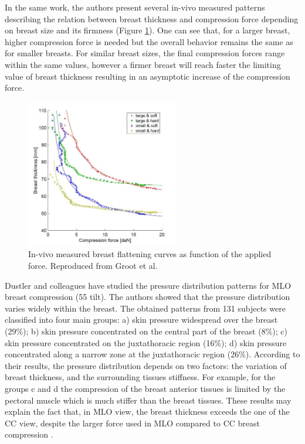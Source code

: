 In the same work, the authors present several in-vivo measured patterns describing the relation between breast thickness and compression force depending on breast size and its firmness (Figure \ref{fig:thickness_force_patterns_groot}). One can see that, for a larger breast, higher compression force is needed but the overall behavior remains the same as for smaller breasts. For similar breast sizes, the final compression forces range within the same values, however a firmer breast will reach faster the limiting value of breast thickness resulting in an asymptotic increase of the compression force.
\begin{figure}[!h]
\centering
\includegraphics[width=0.6\textwidth,keepaspectratio]{figures/thickness_force_patterns_groot.jpg} 
\caption{In-vivo measured breast flattening curves as function of the applied force. Reproduced from Groot et al. \citep{groot_towards_2015}}\label{fig:thickness_force_patterns_groot}
\end{figure}

Dustler and colleagues \citep{dustler_breast_2012} have studied the pressure distribution patterns for MLO breast compression (55 \textdegree tilt). The authors showed that the pressure distribution varies widely within the breast. The obtained patterns from 131 subjects were classified into four main groups: a) skin pressure widespread over the breast (29\%); b) skin pressure concentrated on the central part of the breast (8\%); c) skin pressure concentrated on the juxtathoracic region (16\%); d) skin pressure concentrated along a narrow zone at the juxtathoracic region (26\%). According to their results, the pressure distribution depends on two factors: the variation of breast thickness, and the surrounding tissues stiffness. For example, for the groups c and d the compression of the breast anterior tissues is limited by the pectoral muscle which is much stiffer than the breast tissues.  These results may explain the fact that, in MLO view, the breast thickness exceeds the one of the CC view, despite the larger force used in MLO compared to CC breast compression \citep{mercer_practitioner_2013, helvie_breast_1994}. 

